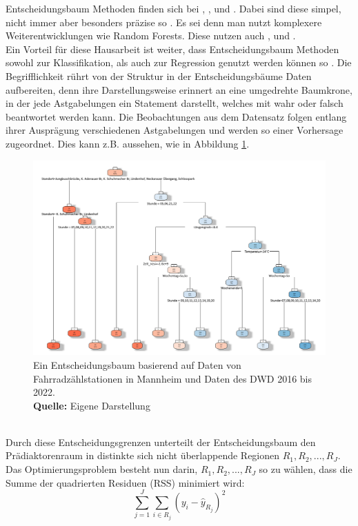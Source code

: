 \documentclass[a4paper,12pt]{thesis}
\newcommand*{\captionsource}[2]{%
	\caption[{#1}]{%
		#1%
		\\\hspace{\linewidth}%
		\textbf{Quelle:} #2%
	}%
}
\begin{document}
Entscheidungsbaum Methoden finden sich bei \cite{Holmgren2017}, \cite{Broucke2019}, \cite{Mitchell2018PredictingBT} und \cite{Gao2022}. Dabei sind diese simpel, nicht immer aber besonders präzise so \cite{James2013TBM}. Es sei denn man nutzt komplexere Weiterentwicklungen wie Random Forests. Diese nutzen auch \cite{Holmgren2017}, \cite{Broucke2019} und \cite{Mitchell2018PredictingBT}.\\ 
Ein Vorteil für diese Hausarbeit ist weiter, dass Entscheidungsbaum Methoden sowohl zur Klassifikation, als auch zur Regression genutzt werden können so \cite{James2013TBM}. Die Begrifflichkeit rührt von der Struktur in der Entscheidungsbäume Daten aufbereiten, denn ihre Darstellungsweise erinnert an eine umgedrehte Baumkrone, in der jede Astgabelungen ein Statement darstellt, welches mit wahr oder falsch beantwortet werden kann. Die Beobachtungen aus dem Datensatz folgen entlang ihrer Ausprägung verschiedenen Astgabelungen und werden so einer Vorhersage zugeordnet. Dies kann z.B. aussehen, wie in Abbildung \ref{DTM1}.
\begin{figure}[!ht]
	\centering
	\includegraphics[width=16cm]{Plots/Entscheidungsbaum.png}
	\captionsource{Ein Entscheidungsbaum basierend auf Daten von Fahrradzählstationen in Mannheim und Daten des DWD 2016 bis 2022.}{
		Eigene Darstellung
	}
	\label{DTM1}
\end{figure}\\
Durch diese Entscheidungsgrenzen unterteilt der Entscheidungsbaum den Prädiaktorenraum in distinkte sich nicht überlappende Regionen $R_1,R_2,...,R_J$. Das Optimierungsproblem besteht nun darin, $R_1,R_2,...,R_J$ so zu wählen, dass die Summe der quadrierten Residuen (RSS) minimiert wird: 
\begin{equation}
	\label{TDM:TreeOptimization}
	\sum_{j=1}^J\sum_{i\in R_j}(y_i - \hat{y}_{R_j})^2
\end{equation}
\end{document}
